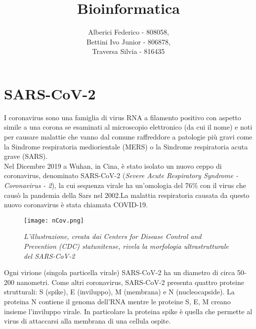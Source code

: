 \documentclass[a4paper,10pt]{article}
\title{Bioinformatica}
\author{Alberici Federico - 808058, \\ Bettini Ivo Junior - 806878, \\ Traversa Silvia - 816435}
\date{}
\begin{document}
\maketitle 

\newpage

\section*{SARS-CoV-2}
I coronavirus sono una famiglia di virus RNA a filamento positivo con aspetto simile a una corona se esaminati al microscopio elettronico (da cui il nome) e noti per causare malattie che vanno dal comune raffreddore a patologie più gravi come la Sindrome respiratoria mediorientale (MERS) o la Sindrome respiratoria acuta grave (SARS). \\
Nel Dicembre 2019 a Wuhan, in Cina, è stato isolato un nuovo ceppo di coronavirus, denominato SARS-CoV-2 (\textit{Severe Acute Respiratory Syndrome - Coronavirus - 2}), la cui sequenza virale ha un'omologia del 76\% con il virus che causò la pandemia della Sars nel 2002.La malattia respiratoria causata da questo nuovo coronavirus è stata chiamata COVID-19.

\begin{figure}[H]
\centering
\texttt{[image: nCov.png]}
\caption{\textit{L’illustrazione, creata dai Centers for Disease Control and Prevention (CDC) statunitense, rivela la morfologia ultrastrutturale del SARS-CoV-2}}
\label{fig:1}
\end{figure}

Ogni virione (singola particella virale) SARS-CoV-2 ha un diametro di circa 50-200 nanometri. Come altri coronavirus, SARS-CoV-2 presenta quattro proteine strutturali: S (spike), E (inviluppo), M (membrana) e N (nucleocapside). La proteina N contiene il genoma dell'RNA mentre le proteine S, E, M creano insieme l'inviluppo virale. %
In particolare la proteina spike è quella che permette al virus di attaccarsi alla membrana di una cellula ospite.\\
\end{document}
